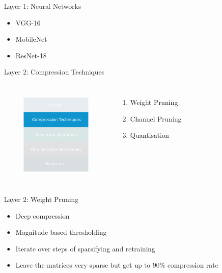 \documentclass[xcolor=dvipsnames]{beamer}
\begin{document}
\begin{frame}{Layer 1: Neural Networks}
\vspace{0.2cm}

\begin{itemize}
    \item VGG-16
    \item MobileNet
    \item ResNet-18
\end{itemize}

\end{frame}


\begin{frame}{Layer 2: Compression Techniques}

\begin{columns}
\begin{figure}
    \centering
    \includegraphics[width=3.5cm]{images/compressions.pdf}
    \label{fig:inference-stack-compress-1}
\end{figure}


\begin{enumerate}
    \item Weight Pruning
    \item Channel Pruning
    \item Quantisation
\end{enumerate}


\end{columns}

\end{frame}



\begin{frame}{Layer 2: Weight Pruning}

\begin{itemize}
    \item Deep compression
    \item Magnitude based thresholding 
    \item Iterate over steps of sparsifying and retraining 
    \item Leave the matrices very sparse but get up to 90\% compression rate
\end{itemize}
    
\end{frame}
\end{document}
